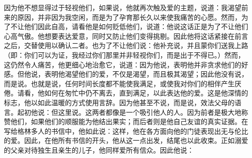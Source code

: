 因为他不想显得过于轻视他们，如果说，他就再次触及爱的主题，说道：我渴望前来的原因，并非因为我空闲，而是为了孕育那长久以来使我痛苦的心愿。然而，为了不让他们因此自高，请看他是如何贬低他们，说道：他说这话正是为了不让他们心高气傲。他想要表达爱意，同时又防止他们变得挑剔。因此他将这话紧接在前言之后，交替使用以确认二者。也为了不让他们说：他补充说，并且蒙你们送我上路（即：你们可以为证，我经过你们那里并非轻视你们，而是出于不得已。）然而，这仍然令人痛苦，他更细心地治愈它，说道：因为他说，表明他并非贪求他们的好感。但他说，表明他渴望他们的爱，不仅是渴望，而且极其渴望；因此他没有说，而是说。也就是说，任何时间长度都不能使我满足，或使我对你们的相伴产生厌倦。请看，他如何在匆忙中仍不离去，直到满足，以此表达他的爱。这是他深情的标志，他以如此温暖的方式使用言辞。因为他甚至不说，而是说，效法父母的语言。起初他说：但这里说。这两者都像是一个吸引他人的人。因为前者是极大地称赞他们，如果他们的顺服能为他结出果实；而后者则是他自己友谊的真实证据。在写给格林多人的书信中，他如此说：这样，他在各方面向他的门徒表现出无与伦比的爱。因此，在他所有书信的开头，他从这一点出发，结尾也以此收束。正如溺爱的父亲对待独生且亲生的儿子，他同样爱所有信众。因此他说：\par

